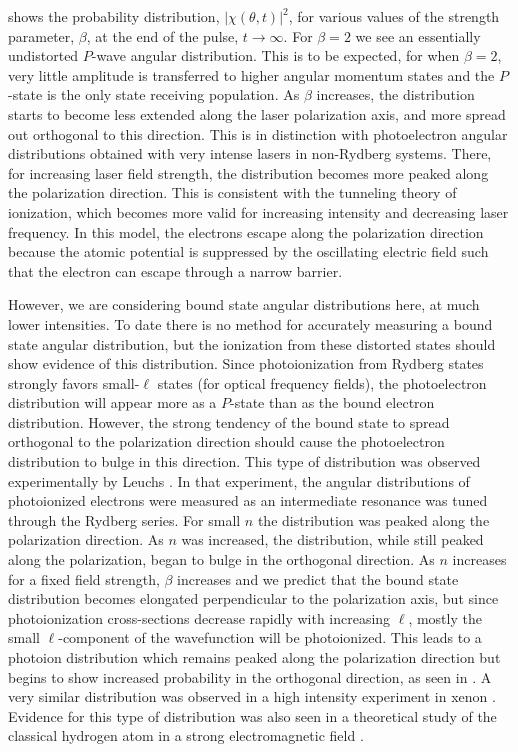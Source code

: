  shows the probability distribution,
$\left|\chi(\theta,t)\right|^2$, for various values of the strength parameter,
$\beta$, at the end of the pulse, $t \rightarrow \infty$.  For $\beta=2$ we see
an essentially undistorted
$P$-wave angular distribution.  This is to be expected, for when $\beta=2$,
very little amplitude is transferred to higher angular momentum states and the
$P$-state is the only state receiving population.  As $\beta$ increases, the
distribution starts to become less extended along the laser polarization axis,
and more spread out orthogonal to this direction.  This is in distinction with
photoelectron angular distributions obtained with very intense lasers in
non-Rydberg systems.  There, for increasing laser field strength, the
distribution becomes more peaked along the polarization direction.  This is
consistent with the tunneling theory of ionization, which becomes more valid
for increasing intensity and decreasing laser frequency.  In this model, the
electrons escape along the polarization direction because the atomic potential
is suppressed by the oscillating electric field such that the electron can
escape through a narrow barrier.

However, we are considering bound state angular distributions here, at
much lower intensities.  To date there is no method for accurately measuring a
bound state angular distribution, but the ionization from these distorted
states should show evidence of this distribution.  Since photoionization from
Rydberg states strongly favors small-$\ell$ states (for optical frequency
fields), the photoelectron distribution will appear more as a $P$-state than
as the bound electron distribution.  However, the strong tendency of the bound
state to spread orthogonal to the polarization direction should cause the
photoelectron distribution to bulge in this direction.  This type of
distribution was observed experimentally by Leuchs \etal \cite{Leuchs:85}. In
that experiment, the angular distributions of photoionized electrons were
measured as an intermediate resonance was tuned through the Rydberg series. For
small $n$ the distribution was peaked along the polarization direction. As
$n$ was increased, the distribution, while still peaked along the
polarization, began to bulge in the orthogonal direction.  As $n$ increases
for a fixed field strength, $\beta$ increases and we predict that the bound
state distribution becomes elongated perpendicular to the polarization axis,
but since photoionization cross-sections decrease rapidly with increasing
$\ell$, mostly the small $\ell$-component of the wavefunction will be
photoionized.  This leads to a photoion distribution which remains peaked
along the polarization direction but begins to show increased probability in
the orthogonal direction, as seen in \cite{Leuchs:85}. A very similar
distribution was observed in a high intensity experiment in xenon
\cite{Yang:93}.  Evidence for this type of distribution was also seen
in a theoretical study of the classical hydrogen atom in a strong
electromagnetic field \cite{Kyrala:87}.

